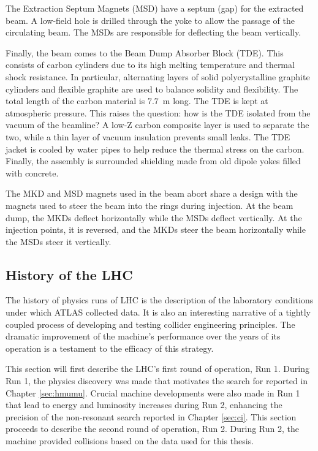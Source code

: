 The Extraction Septum Magnets (MSD) have a septum (gap) for the extracted beam.
A low-field hole is drilled through the yoke to allow the passage of the circulating beam.
The MSDs are responsible for deflecting the beam vertically.

Finally, the beam comes to the Beam Dump Absorber Block (TDE).
This consists of carbon cylinders due to its high melting temperature and thermal shock resistance.
In particular, alternating layers of solid polycrystalline graphite cylinders and flexible graphite are used to balance solidity and flexibility.
The total length of the carbon material is 7.7~m long.
The TDE is kept at atmospheric pressure. This raises the question: how is the TDE isolated from the vacuum of the beamline? A low-Z carbon composite layer is used to separate the two, while a thin layer of vacuum insulation prevents small leaks. \cite{beamdump}
The TDE jacket is cooled by water pipes to help reduce the thermal stress on the carbon.
Finally, the assembly is surrounded shielding made from old dipole yokes filled with concrete.

The MKD and MSD magnets used in the beam abort share a design with the magnets used to steer the beam into the rings during injection.
At the beam dump, the MKDs deflect horizontally while the MSDs deflect vertically.
At the injection points, it is reversed, and the MKDs steer the beam horizontally while the MSDs steer it vertically.


\subsection{History of the LHC}
The history of physics runs of LHC is the description of the laboratory conditions under which ATLAS collected data.
It is also an interesting narrative of a tightly coupled process of developing and testing collider engineering principles.
The dramatic improvement of the machine's performance over the years of its operation is a testament to the efficacy of this strategy.

This section will first describe the LHC's first round of operation, Run 1.
During Run 1, the physics discovery was made that motivates the search for \vhmm reported in Chapter \ref{sec:hmumu}.
Crucial machine developments were also made in Run 1 that lead to energy and luminosity increases during Run 2, enhancing the precision of the non-resonant search reported in Chapter \ref{sec:ci}.
This section proceeds to describe the second round of operation, Run 2.
During Run 2, the machine provided collisions based on the data used for this thesis.

